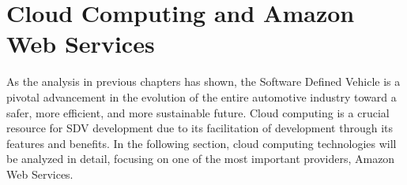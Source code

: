  
\chapter{Cloud Computing and Amazon Web Services} \label{ch:CloudComputingAndAmazonWebServices}

As the analysis in previous chapters has shown, the Software Defined Vehicle is a pivotal advancement in the evolution of the entire automotive industry toward a safer, more efficient, and more sustainable future. Cloud computing is a crucial resource for SDV development due to its facilitation of development through its features and benefits. In the following section, cloud computing technologies will be analyzed in detail, focusing on one of the most important providers, Amazon Web Services.
